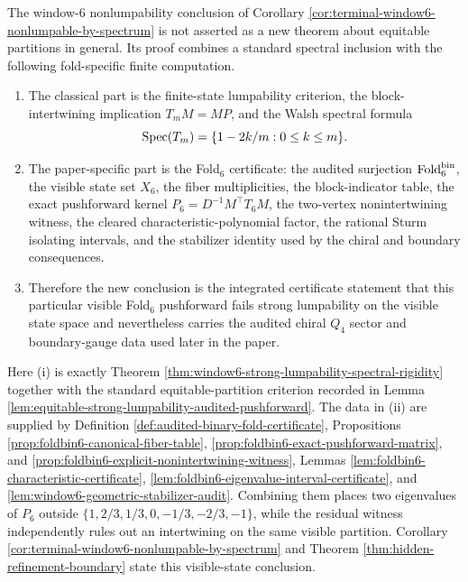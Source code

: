 \begin{remark}\label{rem:fold6-classical-input-computation}
The window-\(6\) nonlumpability conclusion of Corollary \ref{cor:terminal-window6-nonlumpable-by-spectrum} is not asserted as a new theorem about equitable partitions in general.  Its proof combines a standard spectral inclusion with the following fold-specific finite computation.
\begin{enumerate}[label=\textup{(\roman*)}]
\item The classical part is the finite-state lumpability criterion, the block-intertwining implication \(T_mM=MP\), and the Walsh spectral formula
\[
\operatorname{Spec}(T_m)=\{1-2k/m:0\le k\le m\}.
\]
\item The paper-specific part is the Fold\(_6\) certificate: the audited surjection \(\operatorname{Fold}_6^{\mathrm{bin}}\), the visible state set \(X_6\), the fiber multiplicities, the block-indicator table, the exact pushforward kernel \(P_6=D^{-1}M^\top T_6M\), the two-vertex nonintertwining witness, the cleared characteristic-polynomial factor, the rational Sturm isolating intervals, and the stabilizer identity used by the chiral and boundary consequences.
\item Therefore the new conclusion is the integrated certificate statement that this particular visible Fold\(_6\) pushforward fails strong lumpability on the visible state space and nevertheless carries the audited chiral \(Q_4\) sector and boundary-gauge data used later in the paper.
\end{enumerate}
Here \textup{(i)} is exactly Theorem \ref{thm:window6-strong-lumpability-spectral-rigidity} together with the standard equitable-partition criterion recorded in Lemma \ref{lem:equitable-strong-lumpability-audited-pushforward}.  The data in \textup{(ii)} are supplied by Definition \ref{def:audited-binary-fold-certificate}, Propositions \ref{prop:foldbin6-canonical-fiber-table}, \ref{prop:foldbin6-exact-pushforward-matrix}, and \ref{prop:foldbin6-explicit-nonintertwining-witness}, Lemmas \ref{lem:foldbin6-characteristic-certificate}, \ref{lem:foldbin6-eigenvalue-interval-certificate}, and \ref{lem:window6-geometric-stabilizer-audit}.  Combining them places two eigenvalues of \(P_6\) outside \(\{1,2/3,1/3,0,-1/3,-2/3,-1\}\), while the residual witness independently rules out an intertwining on the same visible partition.  Corollary \ref{cor:terminal-window6-nonlumpable-by-spectrum} and Theorem \ref{thm:hidden-refinement-boundary} state this visible-state conclusion.
\end{remark}

\endinput
